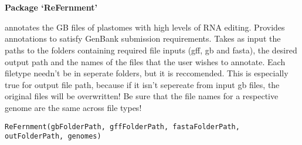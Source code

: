 \documentclass[letterpaper]{book}
\begin{document}
\chapter*{}
\begin{center}
{\textbf{\huge Package `ReFernment'}}
\par\bigskip{\large \today}
\end{center}
\begin{description}
\raggedright{}
\item[Type]
\item[Title]
\item[Version]
\item[Date]
\item[Author]
\item[Maintainer]\AsIs{}\AsIs{}
\item[Description]
\item[License]
\item[Imports]
\item[RoxygenNote]
\end{description}
%
\begin{Description}\relax
annotates the GB files of plastomes with high levels of RNA
editing. Provides annotations to satisfy GenBank submission requirements. 
Takes as input the paths to the folders containing required file inputs
(gff, gb and fasta), the desired output path and the names of the files that
the user wishes to annotate. Each filetype needn't be in seperate folders,
but it is reccomended. This is especially true for output file path, because
if it isn't sepereate from input gb files, the original files will be
overwritten! Be sure that the file names for a respective genome are the same
across file types!
\end{Description}
%
\begin{Usage}
\begin{verbatim}
ReFernment(gbFolderPath, gffFolderPath, fastaFolderPath, outFolderPath, genomes)
\end{verbatim}
\end{Usage}
\end{document}
